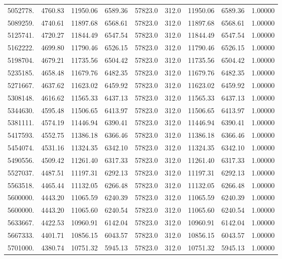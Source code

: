 {\begin{tabular}{rrrrrrrrr}
5052778. & 4760.83& 11950.06 & 6589.36 & 57823.0   & 312.0& 11950.06 & 6589.36 & 1.00000 \\
5089259. & 4740.61& 11897.68 & 6568.61 & 57823.0   & 312.0& 11897.68 & 6568.61 & 1.00000 \\
5125741. & 4720.27& 11844.49 & 6547.54 & 57823.0   & 312.0& 11844.49 & 6547.54 & 1.00000 \\
5162222. & 4699.80& 11790.46 & 6526.15 & 57823.0   & 312.0& 11790.46 & 6526.15 & 1.00000 \\
5198704. & 4679.21& 11735.56 & 6504.42 & 57823.0   & 312.0& 11735.56 & 6504.42 & 1.00000 \\
5235185. & 4658.48& 11679.76 & 6482.35 & 57823.0   & 312.0& 11679.76 & 6482.35 & 1.00000 \\
5271667. & 4637.62& 11623.02 & 6459.92 & 57823.0   & 312.0& 11623.02 & 6459.92 & 1.00000 \\
5308148. & 4616.62& 11565.33 & 6437.13 & 57823.0   & 312.0& 11565.33 & 6437.13 & 1.00000 \\
5344630. & 4595.48& 11506.65 & 6413.97 & 57823.0   & 312.0& 11506.65 & 6413.97 & 1.00000 \\
5381111. & 4574.19& 11446.94 & 6390.41 & 57823.0   & 312.0& 11446.94 & 6390.41 & 1.00000 \\
5417593. & 4552.75& 11386.18 & 6366.46 & 57823.0   & 312.0& 11386.18 & 6366.46 & 1.00000 \\
5454074. & 4531.16& 11324.35 & 6342.10 & 57823.0   & 312.0& 11324.35 & 6342.10 & 1.00000 \\
5490556. & 4509.42& 11261.40 & 6317.33 & 57823.0   & 312.0& 11261.40 & 6317.33 & 1.00000 \\
5527037. & 4487.51& 11197.31 & 6292.13 & 57823.0   & 312.0& 11197.31 & 6292.13 & 1.00000 \\
5563518. & 4465.44& 11132.05 & 6266.48 & 57823.0   & 312.0& 11132.05 & 6266.48 & 1.00000 \\
5600000. & 4443.20& 11065.59 & 6240.39 & 57823.0   & 312.0& 11065.59 & 6240.39 & 1.00000 \\
5600000. & 4443.20& 11065.60 & 6240.54 & 57823.0   & 312.0& 11065.60 & 6240.54 & 1.00000 \\
5633667. & 4422.53& 10960.91 & 6142.04 & 57823.0   & 312.0& 10960.91 & 6142.04 & 1.00000 \\
5667333. & 4401.71& 10856.15 & 6043.57 & 57823.0   & 312.0& 10856.15 & 6043.57 & 1.00000 \\
5701000. & 4380.74& 10751.32 & 5945.13 & 57823.0   & 312.0& 10751.32 & 5945.13 & 1.00000 \\

\end{tabular}}

